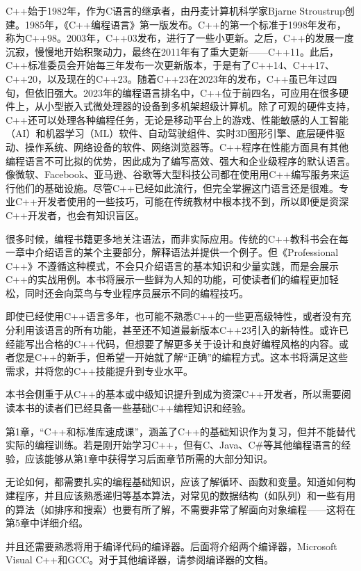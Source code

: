 
C++始于1982年，作为C语言的继承者，由丹麦计算机科学家Bjarne Stroustrup创建。1985年，《C++编程语言》第一版发布。C++的第一个标准于1998年发布，称为C++98。2003年，C++03发布，进行了一些小更新。之后，C++的发展一度沉寂，慢慢地开始积聚动力，最终在2011年有了重大更新——C++11。此后，C++标准委员会开始每三年发布一次更新版本，于是有了C++14、C++17、C++20，以及现在的C++23。随着C++23在2023年的发布，C++虽已年过四旬，但依旧强大。2023年的编程语言排名中，C++位于前四名，可应用在很多硬件上，从小型嵌入式微处理器的设备到多机架超级计算机。除了可观的硬件支持，C++还可以处理各种编程任务，无论是移动平台上的游戏、性能敏感的人工智能（AI）和机器学习（ML）软件、自动驾驶组件、实时3D图形引擎、底层硬件驱动、操作系统、网络设备的软件、网络浏览器等。C++程序在性能方面具有其他编程语言不可比拟的优势，因此成为了编写高效、强大和企业级程序的默认语言。像微软、Facebook、亚马逊、谷歌等大型科技公司都在使用用C++编写服务来运行他们的基础设施。尽管C++已经如此流行，但完全掌握这门语言还是很难。专业C++开发者使用的一些技巧，可能在传统教材中根本找不到，所以即便是资深C++开发者，也会有知识盲区。


很多时候，编程书籍更多地关注语法，而非实际应用。传统的C++教科书会在每一章中介绍语言的某个主要部分，解释语法并提供一个例子。但《Professional C++》不遵循这种模式，不会只介绍语言的基本知识和少量实践，而是会展示C++的实战用例。本书将展示一些鲜为人知的功能，可使读者们的编程更加轻松，同时还会向菜鸟与专业程序员展示不同的编程技巧。


即使已经使用C++语言多年，也可能不熟悉C++的一些更高级特性，或者没有充分利用该语言的所有功能，甚至还不知道最新版本C++23引入的新特性。或许已经能写出合格的C++代码，但想要了解更多关于设计和良好编程风格的内容。或者您是C++的新手，但希望一开始就了解“正确”的编程方式。这本书将满足这些需求，并将您的C++技能提升到专业水平。

本书会侧重于从C++的基本或中级知识提升到成为资深C++开发者，所以需要阅读本书的读者们已经具备一些基础C++编程知识和经验。

第1章，“C++和标准库速成课”，涵盖了C++的基础知识作为复习，但并不能替代实际的编程训练。若是刚开始学习C++，但有C、Java、C\#等其他编程语言的经验，应该能够从第1章中获得学习后面章节所需的大部分知识。

无论如何，都需要扎实的编程基础知识，应该了解循环、函数和变量。知道如何构建程序，并且应该熟悉递归等基本算法，对常见的数据结构（如队列）和一些有用的算法（如排序和搜索）也要有所了解，不需要非常了解面向对象编程——这将在第5章中详细介绍。

并且还需要熟悉将用于编译代码的编译器。后面将介绍两个编译器，Microsoft Visual C++和GCC。对于其他编译器，请参阅编译器的文档。


